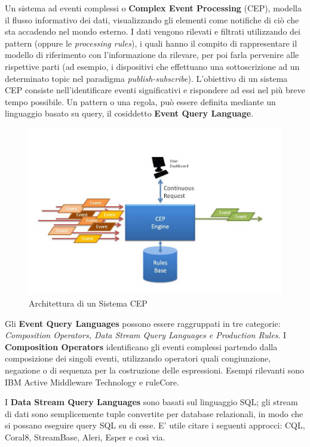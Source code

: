 \documentclass[12pt]{article}
\begin{document}
Un sistema ad eventi complessi o  \textbf{Complex Event Processing} (CEP), modella il flusso informativo dei dati, visualizzando gli elementi come notifiche di ciò che sta accadendo nel mondo esterno. I dati vengono rilevati e filtrati utilizzando dei pattern (oppure le \textit{processing rules}), i quali hanno il compito di rappresentare il modello di riferimento con l'informazione da rilevare, per poi farla pervenire alle rispettive parti (ad esempio, i dispositivi che effettuano una sottoscrizione ad un determinato topic nel paradigma \textit{publish-subscribe}). L'obiettivo di un sistema CEP consiste nell'identificare eventi significativi e rispondere ad essi nel più breve tempo possibile.
Un pattern o una regola, può essere definita mediante un linguaggio basato su query, il cosiddetto \textbf{Event Query
	Language}.
\begin{figure}[H]
	\centering
	\includegraphics[scale=0.50]{images/CEP2.jpg}
	\caption{Architettura di un Sistema CEP\cite{cepimage}}
	\label{archcep}
\end{figure}

Gli \textbf{Event Query Languages} possono essere raggruppati in tre categorie: \textit{Composition Operators, Data Stream Query Languages e
Production Rules}. I \textbf{Composition Operators} identificano gli eventi complessi partendo dalla composizione dei singoli eventi, utilizzando operatori quali congiunzione, negazione o di sequenza per la costruzione delle espressioni. Esempi rilevanti sono IBM Active Middleware Technology e ruleCore. 

I \textbf{Data Stream Query Languages} sono basati sul linguaggio SQL; gli stream di dati sono semplicemente tuple convertite per database relazionali, in modo che si possano eseguire query SQL su di esse. E' utile citare i seguenti approcci: CQL, Coral8, StreamBase,
Aleri, Esper e così via.
\end{document}
